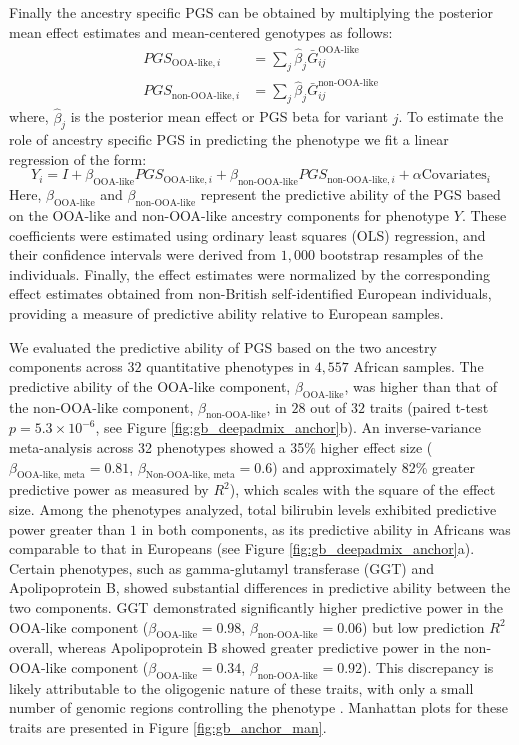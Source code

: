 Finally the ancestry specific PGS can be obtained by multiplying the posterior mean effect estimates and mean-centered genotypes as follows:
\begin{align}
    PGS_{\text{OOA-like}, i} &=  \sum_{j} \hat{\beta}_j \bar{G}_{ij}^{\text{OOA-like}} \\ \nonumber 
    PGS_{\text{non-OOA-like}, i} &= \sum_{j} \hat{\beta}_j \bar{G}_{ij}^{\text{non-OOA-like}}
\end{align}
where, $\hat{\beta}_j$ is the posterior mean effect or PGS beta for variant $j$. To estimate the role of ancestry specific PGS in predicting the phenotype we fit a linear regression of the form:
\begin{equation}
    Y_i = I + \beta_{\text{OOA-like}} PGS_{\text{OOA-like}, i} + \beta_{\text{non-OOA-like}} PGS_{\text{non-OOA-like}, i} + \alpha \text{Covariates}_i
\end{equation}
Here, $\beta_{\text{OOA-like}}$ and $\beta_{\text{non-OOA-like}}$ represent the predictive ability of the PGS based on the OOA-like and non-OOA-like ancestry components for phenotype $Y$. These coefficients were estimated using ordinary least squares (OLS) regression, and their confidence intervals were derived from $1{,}000$ bootstrap resamples of the individuals. Finally, the effect estimates were normalized by the corresponding effect estimates obtained from non-British self-identified European individuals, providing a measure of predictive ability relative to European samples.

We evaluated the predictive ability of PGS based on the two ancestry components across $32$ quantitative phenotypes in $4{,}557$ African samples. The predictive ability of the OOA-like component, $\beta_{\text{OOA-like}}$, was higher than that of the non-OOA-like component, $\beta_{\text{non-OOA-like}}$, in $28$ out of $32$ traits (paired t-test $p = 5.3 \times 10^{-6}$, see Figure \ref{fig:gb_deepadmix_anchor}b). An inverse-variance meta-analysis across 32 phenotypes showed a 35\% higher effect size (\(\beta_{\text{OOA-like, meta}} = 0.81\), \(\beta_{\text{Non-OOA-like, meta}} = 0.6\)) and approximately 82\% greater predictive power as measured by \(R^2\)), which scales with the square of the effect size. Among the phenotypes analyzed, total bilirubin levels exhibited predictive power greater than $1$ in both components, as its predictive ability in Africans was comparable to that in Europeans (see Figure \ref{fig:gb_deepadmix_anchor}a). Certain phenotypes, such as gamma-glutamyl transferase (GGT) and Apolipoprotein B, showed substantial differences in predictive ability between the two components. GGT demonstrated significantly higher predictive power in the OOA-like component ($\beta_{\text{OOA-like}} = 0.98$, $\beta_{\text{non-OOA-like}} = 0.06$) but low prediction $R^2$ overall, whereas Apolipoprotein B showed greater predictive power in the non-OOA-like component ($\beta_{\text{OOA-like}} = 0.34$, $\beta_{\text{non-OOA-like}} = 0.92$). This discrepancy is likely attributable to the oligogenic nature of these traits, with only a small number of genomic regions controlling the phenotype \cite{vuckovic2020polygenic}. Manhattan plots for these traits are presented in Figure \ref{fig:gb_anchor_man}.

